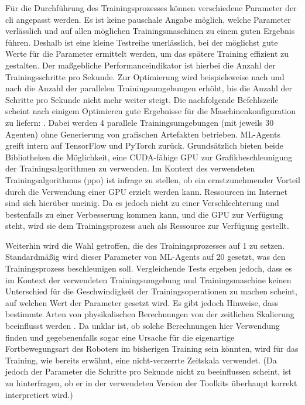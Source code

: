Für die Durchführung des Trainingsprozesses können verschiedene Parameter der \ac{cli} angepasst werden.
Es ist keine pauschale Angabe möglich, welche Parameter verlässlich und auf allen möglichen Trainingsmaschinen zu einem guten Ergebnis führen.
Deshalb ist eine kleine Testreihe unerlässlich, bei der möglichst gute Werte für die Parameter ermittelt werden, um das spätere Training effizient zu gestalten.
Der maßgebliche Performanceindikator ist hierbei die Anzahl der Trainingsschritte pro Sekunde.
Zur Optimierung wird beispielsweise nach und nach die Anzahl der parallelen Trainingsumgebungen erhöht, bis die Anzahl der Schritte pro Sekunde nicht mehr weiter steigt.
Die nachfolgende Befehlszeile scheint nach einigem Optimieren gute Ergebnisse für die Maschinenkonfiguration zu liefern:
.
Dabei werden 4 parallele Trainingsumgebungen (mit jeweils 30 Agenten) ohne Generierung von grafischen Artefakten betrieben.
ML-Agents greift intern auf TensorFlow und PyTorch zurück.
Grundsätzlich bieten beide Bibliotheken die Möglichkeit, eine CUDA-fähige GPU zur Grafikbeschleunigung der Trainingsalgorithmen zu verwenden.
Im Kontext des verwendeten Trainingsalgorithmus (\ac{ppo}) ist infrage zu stellen, ob ein ernstzunehmender Vorteil durch die Verwendung einer GPU erzielt werden kann.
Ressourcen im Internet sind sich hierüber uneinig.
Da es jedoch nicht zu einer Verschlechterung und bestenfalls zu einer Verbesserung kommen kann, und die GPU zur Verfügung steht, wird sie dem Trainingsprozess auch als Ressource zur Verfügung gestellt.

Weiterhin wird die Wahl getroffen, die  des Trainingsprozesses auf 1 zu setzen.
Standardmäßig wird dieser Parameter von ML-Agents auf 20 gesetzt, was den Trainingsprozess beschleunigen soll.
Vergleichende Tests ergeben jedoch, dass es im Kontext der verwendeten Trainingsumgebung und Trainingsmaschine keinen Unterschied für die Geschwindigkeit der Trainingsoperationen zu machen scheint, auf welchen Wert der Parameter gesetzt wird.
Es gibt jedoch Hinweise, dass bestimmte Arten von physikalischen Berechnungen von der zeitlichen Skalierung beeinflusst werden \cite{zhang2021}.
Da unklar ist, ob solche Berechnungen hier Verwendung finden und gegebenenfalls sogar eine Ursache für die eigenartige Fortbewegungsart des Roboters im bisherigen Training sein könnten, wird für das Training, wie bereits erwähnt, eine nicht-verzerrte Zeitskala verwendet.
(Da jedoch der Parameter die Schritte pro Sekunde nicht zu beeinflussen scheint, ist zu hinterfragen, ob er in der verwendeten Version der Toolkits überhaupt korrekt interpretiert wird.)

